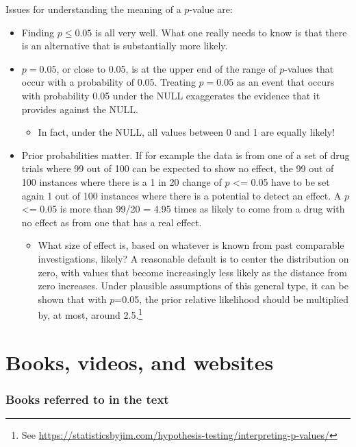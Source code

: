 \documentclass[
  10ptls,
  b5paper]{book}
\providecommand{\tightlist}{%
  \setlength{\itemsep}{0pt}\setlength{\parskip}{0pt}}
\begin{document}
Issues for understanding the meaning of a \(p\)-value are:

\begin{itemize}
\tightlist
\item
  Finding \(p \leq 0.05\) is all very well. What one really needs to know is that there is an alternative that is substantially more likely.
\item
  \(p = 0.05\), or close to 0.05, is at the upper end of the range of \(p\)-values that occur with a probability of 0.05. Treating \(p = 0.05\) as an event that occurs with probability 0.05 under the NULL exaggerates the evidence that it provides against the NULL.

  \begin{itemize}
  \tightlist
  \item
    In fact, under the NULL, all values between 0 and 1 are equally likely!
  \end{itemize}
\item
  Prior probabilities matter. If for example the data is from one of a set of drug trials where 99 out of 100 can be expected to show no effect, the 99 out of 100 instances where there is a 1 in 20 change of \(p\) \textless= 0.05 have to be set again 1 out of 100 instances where there is a potential to detect an effect. A \(p\) \textless= 0.05 is more than 99/20 = 4.95 times as likely to come from a drug with no effect as from one that has a real effect.

  \begin{itemize}
  \tightlist
  \item
    What size of effect is, based on whatever is known from past comparable investigations, likely? A reasonable default is to center the distribution on zero, with values that become increasingly less likely as the distance from zero increases. Under plausible assumptions of this general type, it can be shown that with \(p\)=0.05, the prior relative likelihood should be multiplied by, at most, around 2.5.\footnote{See \url{https://statisticsbyjim.com/hypothesis-testing/interpreting-p-values/}}
  \end{itemize}
\end{itemize}

\backmatter

\chapter{Books, videos, and websites}\label{app:more}

\subsection*{Books referred to in the text}\label{books-referred-to-in-the-text}
\end{document}
